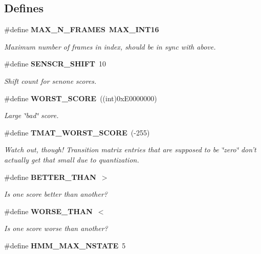 \subsection*{\-Defines}
\begin{DoxyCompactItemize}
\item 
\#define {\bf \-M\-A\-X\-\_\-\-N\-\_\-\-F\-R\-A\-M\-E\-S}~{\bf \-M\-A\-X\-\_\-\-I\-N\-T16}\label{hmm_8h_a5b6b9157cfaaec312508eaed602f0698}

\begin{DoxyCompactList}\small\item\em \-Maximum number of frames in index, should be in sync with above. \end{DoxyCompactList}\item 
\#define {\bf \-S\-E\-N\-S\-C\-R\-\_\-\-S\-H\-I\-F\-T}~10
\begin{DoxyCompactList}\small\item\em \-Shift count for senone scores. \end{DoxyCompactList}\item 
\#define {\bf \-W\-O\-R\-S\-T\-\_\-\-S\-C\-O\-R\-E}~((int)0x\-E0000000)
\begin{DoxyCompactList}\small\item\em \-Large \char`\"{}bad\char`\"{} score. \end{DoxyCompactList}\item 
\#define {\bf \-T\-M\-A\-T\-\_\-\-W\-O\-R\-S\-T\-\_\-\-S\-C\-O\-R\-E}~(-\/255)\label{hmm_8h_a9b38399b544dbb93bc9b7d0094e91db7}

\begin{DoxyCompactList}\small\item\em \-Watch out, though! \-Transition matrix entries that are supposed to be \char`\"{}zero\char`\"{} don't actually get that small due to quantization. \end{DoxyCompactList}\item 
\#define {\bf \-B\-E\-T\-T\-E\-R\-\_\-\-T\-H\-A\-N}~$>$\label{hmm_8h_a2874ab52613ff781c96f570ec0eb0d98}

\begin{DoxyCompactList}\small\item\em \-Is one score better than another? \end{DoxyCompactList}\item 
\#define {\bf \-W\-O\-R\-S\-E\-\_\-\-T\-H\-A\-N}~$<$\label{hmm_8h_aa930fb8fb6fce7f34bcf4018b81d7066}

\begin{DoxyCompactList}\small\item\em \-Is one score worse than another? \end{DoxyCompactList}\item 
\#define {\bf \-H\-M\-M\-\_\-\-M\-A\-X\-\_\-\-N\-S\-T\-A\-T\-E}~5\label{hmm_8h_a1eb055ab0e55008f27d78e7b07a55a1c}


\end{DoxyCompactItemize}
